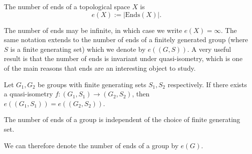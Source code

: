 \begin{definition}
    The number of ends of a topological space \(X\) is 
    \[
        e(X) := |\mathrm{Ends}(X)|.
    \]
\end{definition}

The number of ends may be infinite, in which case we write \(e(X) = \infty\). The same notation extends to the number of ends of a finitely generated group (where \(S\) is a finite generating set) which we denote by \(e((G,S))\). A very useful result is that the number of ends is invariant under quasi-isometry, which is one of the main reasons that ends are an interesting object to study. 

\begin{theorem} \cite[p.~145]{BrHa11}
    Let \(G_1,G_2\) be groups with finite generating sets \(S_1,S_2\) respectively. If there exists a quasi-isometry \(f: (G_1, S_1) \to (G_2,S_2)\), then \(e((G_1,S_1)) = e((G_2,S_2))\).
\end{theorem}

\begin{corollary}
    The number of ends of a group is independent of the choice of finite generating set.
\end{corollary}

We can therefore denote the number of ends of a group by \(e(G)\). 


